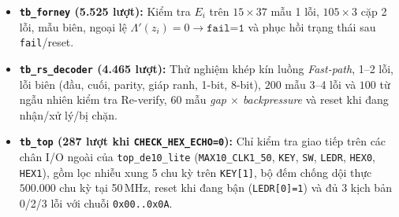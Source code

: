 \documentclass[11pt,a4paper]{report}
\begin{document}
\begin{itemize}
    \item \textbf{\texttt{tb\_forney} (5.525 lượt):} Kiểm tra $E_i$ trên $15\times 37$ mẫu 1 lỗi, $105\times 3$ cặp 2 lỗi, mẫu biên, ngoại lệ $\Lambda'(z_i)=0 \to \texttt{fail=1}$ và phục hồi trạng thái sau \texttt{fail}/reset.
    \item \textbf{\texttt{tb\_rs\_decoder} (4.465 lượt):} Thử nghiệm khép kín luồng \textit{Fast-path}, 1--2 lỗi, lỗi biên (đầu, cuối, parity, giáp ranh, 1-bit, 8-bit), $200$ mẫu 3--4 lỗi và $100$ từ ngẫu nhiên kiểm tra Re-verify, $60$ mẫu \textit{gap $\times$ backpressure} và reset khi đang nhận/xử lý/bị chặn.
    \item \textbf{\texttt{tb\_top} (287 lượt khi \texttt{CHECK\_HEX\_ECHO=0}):} Chỉ kiểm tra giao tiếp trên các chân I/O ngoài của \texttt{top\_de10\_lite} (\texttt{MAX10\_CLK1\_50}, \texttt{KEY}, \texttt{SW}, \texttt{LEDR}, \texttt{HEX0}, \texttt{HEX1}), gồm lọc nhiễu xung 5 chu kỳ trên \texttt{KEY[1]}, bộ đếm chống dội thực $500.000$ chu kỳ tại 50\,MHz, reset khi đang bận (\texttt{LEDR[0]=1}) và đủ 3 kịch bản 0/2/3 lỗi với chuỗi \texttt{0x00..0x0A}.
\end{itemize}
\end{document}

